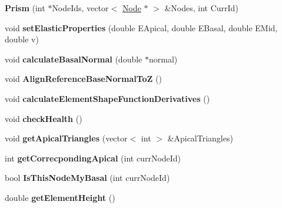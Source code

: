 \begin{DoxyCompactItemize}
\item 
\hypertarget{classPrism_aa107f8923cbbc9e1881cf98666743ae6}{}{\bfseries Prism} (int $\ast$Node\+Ids, vector$<$ \hyperlink{classNode}{Node} $\ast$ $>$ \&Nodes, int Curr\+Id)\label{classPrism_aa107f8923cbbc9e1881cf98666743ae6}

\item 
\hypertarget{classPrism_ab1eaaa559c1997fa7b30e84d7ce6b2d5}{}void {\bfseries set\+Elastic\+Properties} (double E\+Apical, double E\+Basal, double E\+Mid, double v)\label{classPrism_ab1eaaa559c1997fa7b30e84d7ce6b2d5}

\item 
\hypertarget{classPrism_aa65f89d72659c92de21c411a2fa23a7e}{}void {\bfseries calculate\+Basal\+Normal} (double $\ast$normal)\label{classPrism_aa65f89d72659c92de21c411a2fa23a7e}

\item 
\hypertarget{classPrism_a64100d877e59727ab9b7e9ad56e17cee}{}void {\bfseries Align\+Reference\+Base\+Normal\+To\+Z} ()\label{classPrism_a64100d877e59727ab9b7e9ad56e17cee}

\item 
\hypertarget{classPrism_a9a877cebf651015b88af641f1e045699}{}void {\bfseries calculate\+Element\+Shape\+Function\+Derivatives} ()\label{classPrism_a9a877cebf651015b88af641f1e045699}

\item 
\hypertarget{classPrism_af4ce210a9ba20d34b4b903e936b9dd8d}{}void {\bfseries check\+Health} ()\label{classPrism_af4ce210a9ba20d34b4b903e936b9dd8d}

\item 
\hypertarget{classPrism_ad9b04b2ad4cdedb878b4c7c0b4917a7a}{}void {\bfseries get\+Apical\+Triangles} (vector$<$ int $>$ \&Apical\+Triangles)\label{classPrism_ad9b04b2ad4cdedb878b4c7c0b4917a7a}

\item 
\hypertarget{classPrism_a10377e0ad0ae454a3cd25b82709119ac}{}int {\bfseries get\+Correcponding\+Apical} (int curr\+Node\+Id)\label{classPrism_a10377e0ad0ae454a3cd25b82709119ac}

\item 
\hypertarget{classPrism_abe648c5fa60635a50c14186135bed332}{}bool {\bfseries Is\+This\+Node\+My\+Basal} (int curr\+Node\+Id)\label{classPrism_abe648c5fa60635a50c14186135bed332}

\item 
\hypertarget{classPrism_a91d08cfcf6bf111f5d9e314499bafd11}{}double {\bfseries get\+Element\+Height} ()\label{classPrism_a91d08cfcf6bf111f5d9e314499bafd11}


\end{DoxyCompactItemize}
